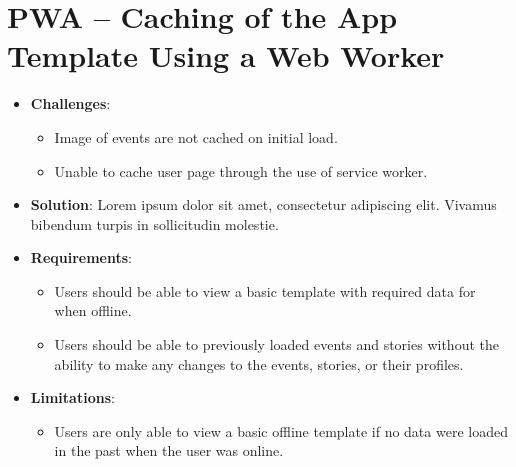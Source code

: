 \documentclass[11pt, a4paper]{article}
\begin{document}
\section{PWA – Caching of the App Template Using a Web Worker}
\begin{itemize}
  \item \textbf{Challenges}: 
  \begin{itemize}
    \item Image of events are not cached on initial load.
    \item Unable to cache user page through the use of service worker.
  \end{itemize}
  \item \textbf{Solution}: Lorem ipsum dolor sit amet, consectetur adipiscing elit. Vivamus bibendum
  turpis in sollicitudin molestie.
  \item \textbf{Requirements}: 
  \begin{itemize}
    \item Users should be able to view a basic template with required data for when offline.
    \item Users should be able to previously loaded events and stories without the ability to make any 
    changes to the events, stories, or their profiles.
  \end{itemize}
  \item \textbf{Limitations}: 
  \begin{itemize}
    \item Users are only able to view a basic offline template if no data were loaded in the past when 
    the user was online.
  \end{itemize}
\end{itemize}
\end{document}
